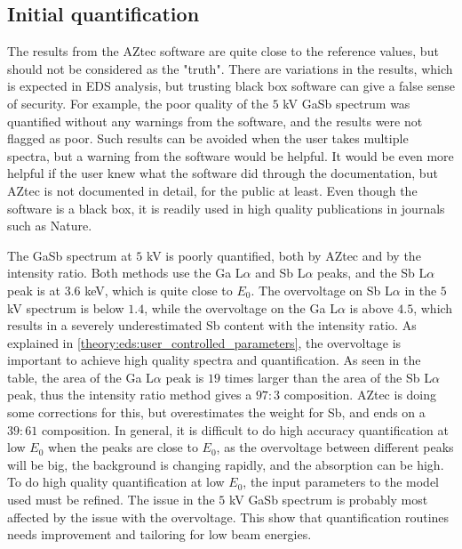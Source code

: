 \subsection{Initial quantification}
\label{discussion:quantitative:initial_quantification}


The results from the AZtec software are quite close to the reference values, but should not be considered as the "truth".
There are variations in the results, which is expected in EDS analysis, but trusting black box software can give a false sense of security.
For example, the poor quality of the $5$ kV GaSb spectrum was quantified without any warnings from the software, and the results were not flagged as poor.
Such results can be avoided when the user takes multiple spectra, but a warning from the software would be helpful.
It would be even more helpful if the user knew what the software did through the documentation, but AZtec is not documented in detail, for the public at least.
Even though the software is a black box, it is readily used in high quality publications in journals such as Nature\cite{aztec_nature_2019}.


The GaSb spectrum at $5$ kV is poorly quantified, both by AZtec and by the intensity ratio.
Both methods use the Ga L$\alpha$ and Sb L$\alpha$ peaks, and the Sb L$\alpha$ peak is at $3.6$ keV, which is quite close to $E_0$.
The overvoltage on Sb L$\alpha$ in the $5$ kV spectrum is below $1.4$, while the overvoltage on the Ga L$\alpha$ is above $4.5$, which results in a severely underestimated Sb content with the intensity ratio.
As explained in \cref{theory:eds:user_controlled_parameters}, the overvoltage is important to achieve high quality spectra and quantification.
As seen in the table, the area of the Ga L$\alpha$ peak is $19$ times larger than the area of the Sb L$\alpha$ peak, thus the intensity ratio method gives a $97:3$ composition.
AZtec is doing some corrections for this, but overestimates the weight for Sb, and ends on a $39:61$ composition.
In general, it is difficult to do high accuracy quantification at low $E_0$ when the peaks are close to $E_0$, as the overvoltage between different peaks will be big, the background is changing rapidly, and the absorption can be high.
To do high quality quantification at low $E_0$, the input parameters to the model used must be refined.
The issue in the $5$ kV GaSb spectrum is probably most affected by the issue with the overvoltage.
This show that quantification routines needs improvement and tailoring for low beam energies.





